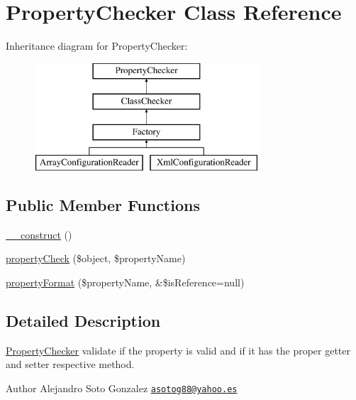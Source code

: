 \hypertarget{class_property_checker}{\section{Property\-Checker Class Reference}
\label{class_property_checker}
}
Inheritance diagram for Property\-Checker\-:\begin{figure}[H]
\begin{center}
\leavevmode
\includegraphics[height=4.000000cm]{class_property_checker}
\end{center}
\end{figure}
\subsection*{Public Member Functions}
\begin{DoxyCompactItemize}
\item 
\hyperlink{class_property_checker_a095c5d389db211932136b53f25f39685}{\-\_\-\-\_\-construct} ()
\item 
\hyperlink{class_property_checker_a1754a2a0e4b1aa7bc619f8caabd3d03f}{property\-Check} (\$object, \$property\-Name)
\item 
\hyperlink{class_property_checker_a1677a0a1db26a8ca36feb5c6de858d0e}{property\-Format} (\$property\-Name, \&\$is\-Reference=null)
\end{DoxyCompactItemize}


\subsection{Detailed Description}
\hyperlink{class_property_checker}{Property\-Checker} validate if the property is valid and if it has the proper getter and setter respective method.

\begin{DoxyAuthor}{Author}
Alejandro Soto Gonzalez \href{mailto:asotog88@yahoo.es}{\tt asotog88@yahoo.\-es} 
\end{DoxyAuthor}


